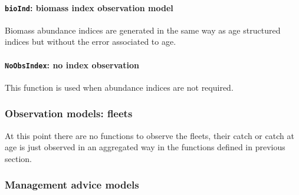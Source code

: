 	\paragraph{\texttt{bioInd}: biomass index observation model} \hspace{0pt} \smallskip

	Biomass abundance indices are generated in the same way as age structured indices but without
	the error associated to age.
  
  \paragraph{\texttt{NoObsIndex}: no index observation} \hspace{0pt} \smallskip

  This function is used when abundance indices are not required.


\subsubsection{Observation models: fleets} 
	At this point there are no functions to observe the fleets, their catch or catch at age is 
	just observed in an aggregated way in the functions defined in previous section. 


\subsubsection{Management advice models}

